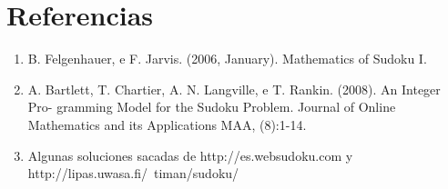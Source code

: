 \documentclass[10pt,a4paper]{article}
\begin{document}

\fecha{\today}




\maketitle

\newpage
\tableofcontents

\newpage


\newpage


\newpage


\newpage


\section{Referencias}

\begin{enumerate}
  \item B. Felgenhauer, e F. Jarvis. (2006, January). Mathematics of Sudoku I. 
  \item A. Bartlett, T. Chartier, A. N. Langville, e T. Rankin. (2008). An Integer Pro- gramming Model for the Sudoku Problem. Journal of Online Mathematics and its Applications MAA, (8):1-14.
  \item Algunas soluciones sacadas de http://es.websudoku.com y http://lipas.uwasa.fi/~timan/sudoku/

\end{enumerate}
\end{document}
